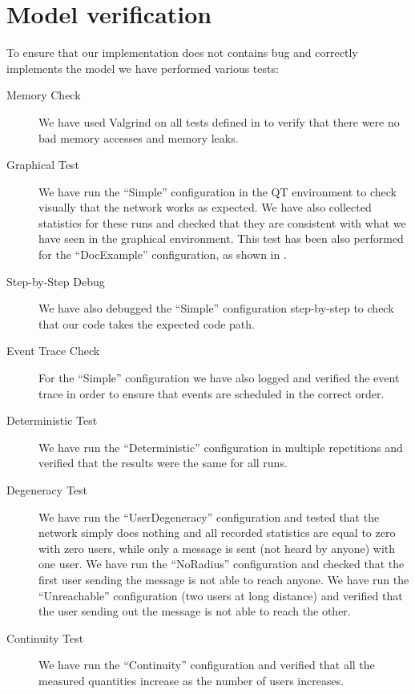 \section{Model verification}\label{sec:verification}

To ensure that our implementation does not contains bug and correctly implements
the model we have performed various tests:
\begin{description}
	\item[Memory Check] We have used Valgrind on all tests defined in
		 to verify that there were no bad memory
		accesses and memory leaks.
	\item[Graphical Test] We have run the ``Simple'' configuration in the
		\omnetpp{} QT environment to check visually that the network
		works as expected. We have also collected statistics for these
		runs and checked that they are consistent with what we have seen
		in the graphical environment. This test has been also performed
		for the ``DocExample'' configuration, as shown in
		.
	\item[Step-by-Step Debug] We have also debugged the ``Simple''
		configuration step-by-step to check that our code takes the
		expected code path.
	\item[Event Trace Check] For the ``Simple'' configuration we have also
		logged and verified the event trace in order to ensure that
		events are scheduled in the correct order.
	\item[Deterministic Test] We have run the ``Deterministic''
		configuration in multiple repetitions and verified that the
		results were the same for all runs.
	\item[Degeneracy Test] We have run the ``UserDegeneracy'' configuration
		and tested that the network simply does nothing and all recorded
		statistics are equal to zero with zero users, while only a
		message is sent (not heard by anyone) with one user. We have run
		the ``NoRadius'' configuration and checked that the first user
		sending the message is not able to reach anyone. We have run the
		``Unreachable'' configuration (two users at long distance) and
		verified that the user sending out the message is not able to
		reach the other.
	\item[Continuity Test] We have run the ``Continuity'' configuration and
		verified that all the measured quantities increase as the number
		of users increases.
\end{description}
